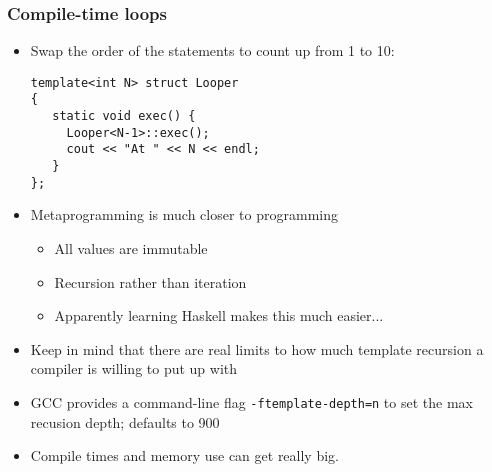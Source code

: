 
\begin{frame}[fragile,t]
\frametitle{Compile-time loops}
\begin{itemize}[<+->]
\item Swap the order of the statements to count up from 1 to 10:
{\scriptsize\begin{verbatim}
template<int N> struct Looper
{
   static void exec() { 
     Looper<N-1>::exec();
     cout << "At " << N << endl;
   }
};
\end{verbatim}
}

\item Metaprogramming is much closer to  programming
  \begin{itemize}[<+->]
  \item All values are immutable
  \item Recursion rather than iteration
  \item Apparently learning Haskell makes this much easier...
  \end{itemize}
\vskip 12pt
\item Keep in mind that there are real limits to how much template
  recursion a compiler is willing to put up with
\item GCC provides a command-line flag \texttt{-ftemplate-depth=n} to
  set the max recusion depth; defaults to 900
\item Compile times and memory use can get really big.
\end{itemize}

\end{frame}
